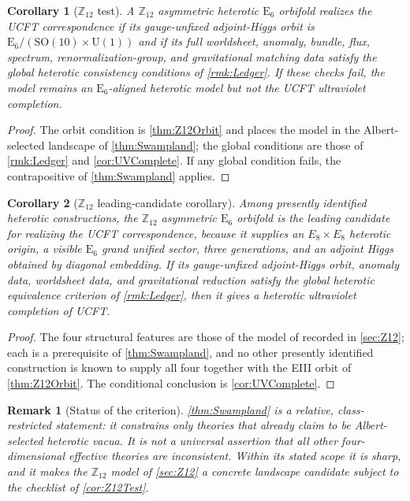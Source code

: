 \documentclass[pdflatex,sn-mathphys-num]{sn-jnl}
\theoremstyle{thmstyleone}
\newtheorem{corollary}[corollary]{Corollary}
\theoremstyle{thmstyletwo}%
\newtheorem{remark}{Remark}%
\theoremstyle{thmstylethree}%
\newcommand{\SO}[1]{\mathrm{SO(#1)}}
\newcommand{\U}[1]{\mathrm{U(#1)}}
\newcommand{\E}[1]{\mathrm{E_{#1}}}
\newcommand{\SOTen}{\SO{10}}
\newcommand{\UOne}{\U{1}}
\newcommand{\ESix}{\E{6}}
\newcommand{\SOTenXUOne}{\SOTen \times \UOne}
\newcommand{\MCosetInline}{\ESix/(\SOTenXUOne)}
\begin{document}
\begin{corollary}[$\mathbb Z_{12}$ test]
\label{cor:Z12Test}
A $\mathbb Z_{12}$ asymmetric heterotic $\ESix$ orbifold realizes the UCFT
correspondence if its gauge-unfixed adjoint-Higgs orbit is $\MCosetInline$ and
if its full worldsheet, anomaly, bundle, flux, spectrum, renormalization-group,
and gravitational matching data satisfy the global heterotic consistency
conditions of \autoref{rmk:Ledger}.  If these checks fail, the model remains an
$\ESix$-aligned heterotic model but not the UCFT ultraviolet completion.
\end{corollary}

\begin{proof}
The orbit condition is \autoref{thm:Z12Orbit} and places the model in the
Albert-selected landscape of \autoref{thm:Swampland}; the global conditions are
those of \autoref{rmk:Ledger} and \autoref{cor:UVComplete}.  If any global
condition fails, the contrapositive of \autoref{thm:Swampland} applies.
\end{proof}

\begin{corollary}[$\mathbb Z_{12}$ leading-candidate corollary]
\label{cor:Z12Leading}
Among presently identified heterotic constructions, the $\mathbb Z_{12}$
asymmetric $\ESix$ orbifold is the leading candidate for realizing the UCFT
correspondence, because it supplies an $E_{8}\times E_{8}$ heterotic origin,
a visible $\ESix$ grand unified sector, three generations, and an adjoint Higgs
obtained by diagonal embedding.  If its gauge-unfixed adjoint-Higgs orbit,
anomaly data, worldsheet data, and gravitational reduction satisfy the global
heterotic equivalence criterion of \autoref{rmk:Ledger}, then it gives a
heterotic ultraviolet completion of UCFT.
\end{corollary}

\begin{proof}
The four structural features are those of the model of
\cite{Z12Heterotic} recorded in \autoref{sec:Z12}; each is a prerequisite of
\autoref{thm:Swampland}, and no other presently identified construction is known
to supply all four together with the EIII orbit of \autoref{thm:Z12Orbit}.  The
conditional conclusion is \autoref{cor:UVComplete}.
\end{proof}

\begin{remark}[Status of the criterion]
\label{rmk:SwamplandStatus}
\autoref{thm:Swampland} is a relative, class-restricted statement: it constrains
only theories that already claim to be Albert-selected heterotic vacua.  It is
not a universal assertion that all other four-dimensional effective theories are
inconsistent.  Within its stated scope it is sharp, and it makes the
$\mathbb Z_{12}$ model of \autoref{sec:Z12} a concrete landscape candidate
subject to the checklist of \autoref{cor:Z12Test}.
\end{remark}
\end{document}
